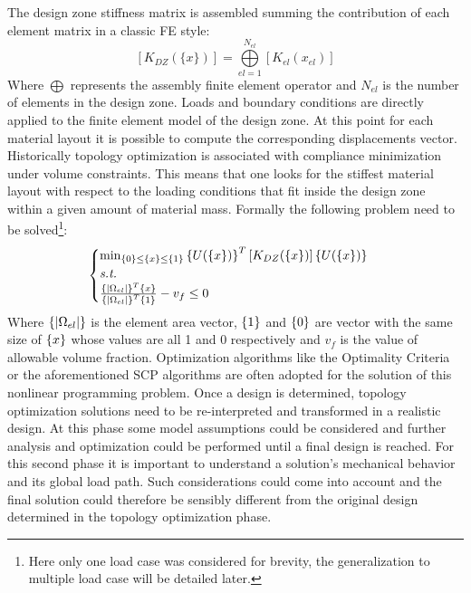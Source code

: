 The design zone stiffness matrix is assembled summing the contribution of each element matrix in a classic FE style:
\begin{equation}
\label{eq.8}
\left[K_{DZ}(\lbrace x\rbrace)\right]=\overset{N_{el}}{\underset{el=1}{\bigoplus}}\left[K_{el}(x_{el})\right]
\end{equation}
Where $\bigoplus$ represents the assembly finite element operator and $N_{el}$ is the number of elements in the design zone.
Loads and boundary conditions are directly applied to the finite element model of the design zone. At this point for each material layout it is possible to compute the corresponding displacements vector. Historically topology optimization is associated with compliance minimization under volume constraints. This means that one looks for the stiffest material layout with respect to the loading conditions that fit inside the design zone within a given amount of material mass.
Formally the following problem need to be solved\footnote{Here only one load case was considered for brevity, the generalization to multiple load case will be detailed later.}:
\begin{equation}
\label{compl_formulation}
\begin{cases}
\min_{\left\lbrace{0}\right \rbrace\leq\left\lbrace{x}\right \rbrace\leq\left\lbrace{1}\right \rbrace} {\left\lbrace{U(\lbrace x\rbrace)}\right \rbrace^T\left[K_{DZ}(\lbrace x\rbrace)\right]\left\lbrace{U(\lbrace x\rbrace)}\right \rbrace} \\
\textit{s.t.}\\
\frac{\left\lbrace{|\Omega_{el}|}\right \rbrace^T\left\lbrace{x}\right \rbrace}{\left\lbrace{|\Omega_{el}|}\right \rbrace^T\left\lbrace{1}\right \rbrace}-v_f\leq 0
\end{cases}
\end{equation}
Where $\left\lbrace{|\Omega_{el}|}\right \rbrace$ is the element area vector, $\left\lbrace{1}\right \rbrace$ and $\left\lbrace{0}\right \rbrace$ are vector with the same size of $\left\lbrace{x}\right \rbrace$ whose values are all 1 and 0 respectively and $v_f$ is the value of allowable volume fraction. Optimization algorithms like the Optimality Criteria \cite{bendsoe1995optimization} or the aforementioned SCP algorithms \cite{svanberg1987method} are often adopted for the solution of this nonlinear programming problem. Once a design is determined, topology optimization solutions need to be re-interpreted and transformed in a realistic design. At this phase some model assumptions could be considered and further analysis and optimization could be performed until a final design is reached. For this second phase it is important to understand a solution's mechanical behavior and its global load path. Such considerations could come into account and the final solution could therefore be sensibly different from the original design determined in the topology optimization phase.
\clearpage
